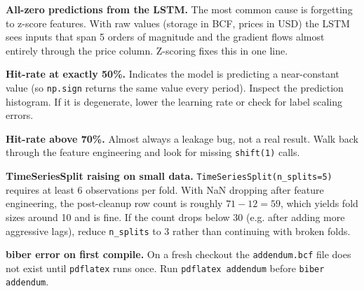 \documentclass[11pt,letterpaper]{article}
\begin{document}
\textbf{All-zero predictions from the LSTM.} The most common cause is forgetting to z-score features. With raw values (storage in BCF, prices in USD) the LSTM sees inputs that span 5 orders of magnitude and the gradient flows almost entirely through the price column. Z-scoring fixes this in one line.

\textbf{Hit-rate at exactly 50\%.} Indicates the model is predicting a near-constant value (so \texttt{np.sign} returns the same value every period). Inspect the prediction histogram. If it is degenerate, lower the learning rate or check for label scaling errors.

\textbf{Hit-rate above 70\%.} Almost always a leakage bug, not a real result. Walk back through the feature engineering and look for missing \texttt{shift(1)} calls.

\textbf{TimeSeriesSplit raising on small data.} \texttt{TimeSeriesSplit(n\_splits=5)} requires at least 6 observations per fold. With NaN dropping after feature engineering, the post-cleanup row count is roughly $71 - 12 = 59$, which yields fold sizes around 10 and is fine. If the count drops below 30 (e.g. after adding more aggressive lags), reduce \texttt{n\_splits} to 3 rather than continuing with broken folds.

\textbf{biber error on first compile.} On a fresh checkout the \texttt{addendum.bcf} file does not exist until \texttt{pdflatex} runs once. Run \texttt{pdflatex addendum} before \texttt{biber addendum}.

\printbibliography
\end{document}

